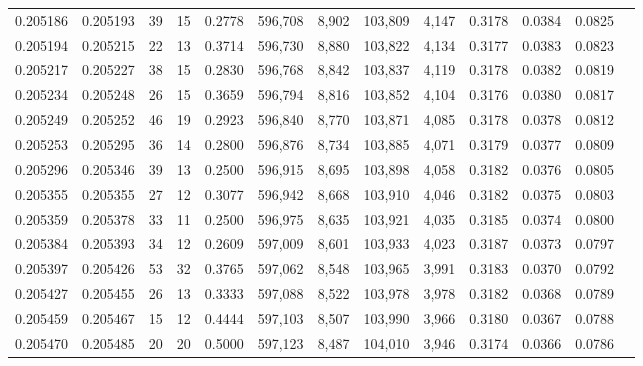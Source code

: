 \begin{tabular}{rrrrrrrrrrrrr}
0.205186 & 0.205193 &    39 &  15 &                                     0.2778 & 596,708 &   8,902 & 103,809 &   4,147 & 0.3178 & 0.0384 & 0.0825 \\
0.205194 & 0.205215 &    22 &  13 &                                     0.3714 & 596,730 &   8,880 & 103,822 &   4,134 & 0.3177 & 0.0383 & 0.0823 \\
0.205217 & 0.205227 &    38 &  15 &                                     0.2830 & 596,768 &   8,842 & 103,837 &   4,119 & 0.3178 & 0.0382 & 0.0819 \\
0.205234 & 0.205248 &    26 &  15 &                                     0.3659 & 596,794 &   8,816 & 103,852 &   4,104 & 0.3176 & 0.0380 & 0.0817 \\
0.205249 & 0.205252 &    46 &  19 &                                     0.2923 & 596,840 &   8,770 & 103,871 &   4,085 & 0.3178 & 0.0378 & 0.0812 \\
0.205253 & 0.205295 &    36 &  14 &                                     0.2800 & 596,876 &   8,734 & 103,885 &   4,071 & 0.3179 & 0.0377 & 0.0809 \\
0.205296 & 0.205346 &    39 &  13 &                                     0.2500 & 596,915 &   8,695 & 103,898 &   4,058 & 0.3182 & 0.0376 & 0.0805 \\
0.205355 & 0.205355 &    27 &  12 &                                     0.3077 & 596,942 &   8,668 & 103,910 &   4,046 & 0.3182 & 0.0375 & 0.0803 \\
0.205359 & 0.205378 &    33 &  11 &                                     0.2500 & 596,975 &   8,635 & 103,921 &   4,035 & 0.3185 & 0.0374 & 0.0800 \\
0.205384 & 0.205393 &    34 &  12 &                                     0.2609 & 597,009 &   8,601 & 103,933 &   4,023 & 0.3187 & 0.0373 & 0.0797 \\
0.205397 & 0.205426 &    53 &  32 &                                     0.3765 & 597,062 &   8,548 & 103,965 &   3,991 & 0.3183 & 0.0370 & 0.0792 \\
0.205427 & 0.205455 &    26 &  13 &                                     0.3333 & 597,088 &   8,522 & 103,978 &   3,978 & 0.3182 & 0.0368 & 0.0789 \\
0.205459 & 0.205467 &    15 &  12 &                                     0.4444 & 597,103 &   8,507 & 103,990 &   3,966 & 0.3180 & 0.0367 & 0.0788 \\
0.205470 & 0.205485 &    20 &  20 &                                     0.5000 & 597,123 &   8,487 & 104,010 &   3,946 & 0.3174 & 0.0366 & 0.0786 \\

\end{tabular}
